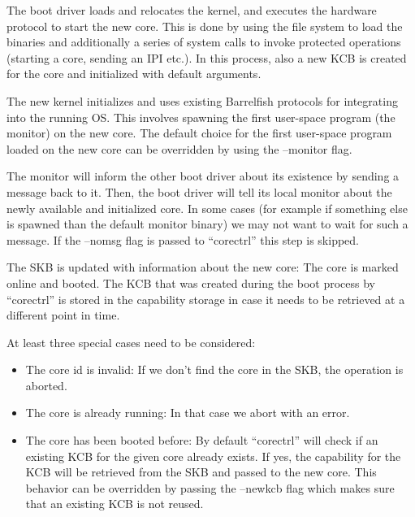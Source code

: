 \documentclass[a4paper,11pt,twoside]{report}
\begin{document}
{{\begin{penumerate}
\item The boot driver loads and relocates the kernel, and executes the hardware
protocol to start the new core. This is done by using the file system to load
the binaries and additionally a series of system calls to invoke protected
operations (starting a core, sending an IPI etc.). In this process, also a new
KCB is created for the core and initialized with default arguments.

\item The new kernel initializes and uses existing Barrelfish protocols for
integrating into the running OS. This involves spawning the first user-space
program (the monitor) on the new core. The default choice
for the first user-space program loaded on the new core can be overridden
by using the --monitor flag.

\item The monitor will inform the other boot driver about its existence by
sending a message back to it. Then, the boot driver will tell its local monitor
about the newly available and initialized core. In some cases (for example if
something else is spawned than the default monitor binary) we may not want to
wait for such a message. If the --nomsg flag is passed to ``corectrl'' this
step is skipped.

\item The SKB is updated with information about the new core: The core is marked
online and booted. The KCB that was created during the boot process by
``corectrl'' is stored in the capability storage in case it needs to be
retrieved at a different point in time.

\end{penumerate}

At least three special cases need to be considered:

\begin{itemize}

    \item The core id is invalid: If we don't find the core in the SKB,
    the operation is aborted.

    \item The core is already running: In that case we abort with an error.

    \item The core has been booted before: By default ``corectrl'' will check if
    an existing KCB for the given core already exists. If yes, the capability
    for the KCB will be retrieved from the SKB and passed to the new core. This
    behavior can be overridden by passing the --newkcb flag which makes sure
    that an existing KCB is not reused.


\end{itemize}}}
\end{document}
